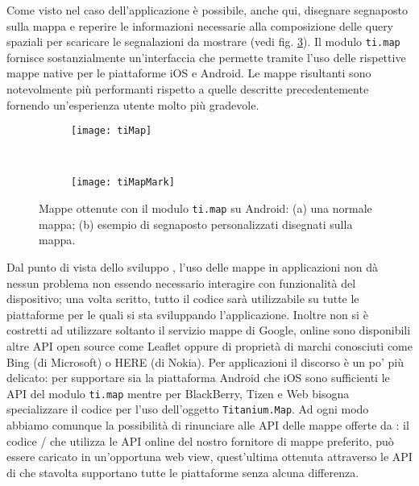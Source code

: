             Come visto nel caso dell'applicazione \pg{} è possibile, anche qui,
            disegnare segnaposto sulla mappa e reperire le informazioni
            necessarie alla composizione delle query spaziali per scaricare le
            segnalazioni da mostrare (vedi fig. \ref{fig:TiMaps}). Il modulo
            \texttt{ti.map} fornisce sostanzialmente un'interfaccia che permette
            tramite \js{} l'uso delle rispettive mappe native per le piattaforme
            iOS e Android. Le mappe risultanti sono notevolmente più performanti
            rispetto a quelle descritte precedentemente fornendo un'esperienza
            utente molto più gradevole.
            \begin{figure}[H]
                \centering
                \begin{subfigure}[b]{0.485\textwidth}
                    \texttt{[image: tiMap]}
                    \caption{}
                    \label{fig:tiMap}
                \end{subfigure}
                ~
                \begin{subfigure}[b]{0.485\textwidth}
                    \texttt{[image: tiMapMark]}
                    \caption{}
                    \label{fig:tiMapMark}
                \end{subfigure}
                \caption{
                    Mappe ottenute con il modulo \texttt{ti.map} su Android: (a)
                    una normale mappa; (b) esempio di segnaposto personalizzati
                    disegnati sulla mappa.
                }
                \label{fig:TiMaps}
            \end{figure}
            Dal punto di vista dello sviluppo \crossplat{}, l'uso delle mappe in
            applicazioni \pg{} non dà nessun problema non essendo necessario
            interagire con funzionalità del dispositivo; una volta scritto,
            tutto il codice sarà utilizzabile su tutte le piattaforme per le
            quali si sta sviluppando l'applicazione. Inoltre non si è
            costretti ad utilizzare soltanto il servizio mappe di Google, online
            sono disponibili altre API \js{} open source come Leaflet oppure
            di proprietà di marchi conosciuti come Bing (di Microsoft) o HERE
            (di Nokia). Per applicazioni \tisdk{} il discorso è un po' più
            delicato: per supportare sia la piattaforma Android che iOS sono
            sufficienti le API del modulo \texttt{ti.map} mentre per BlackBerry,
            Tizen e Web bisogna specializzare il codice per l'uso dell'oggetto
            \texttt{Titanium.Map}. Ad ogni modo abbiamo comunque la possibilità
            di rinunciare alle API delle mappe offerte da \tisdk{}: il codice
            \js{}/\html{} che utilizza le API online del nostro fornitore di
            mappe preferito, può essere caricato in un'opportuna web view,
            quest'ultima ottenuta attraverso le API di \tisdk{} che stavolta
            supportano tutte le piattaforme senza alcuna differenza.


